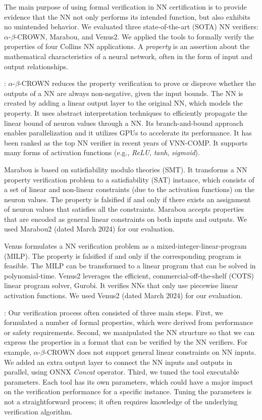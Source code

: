 The main purpose of using formal verification in NN certification is to provide evidence that the NN not only performs its intended function, but also exhibits no unintended behavior. 
We evaluated three state-of-the-art (SOTA) NN verifiers: $\alpha$-$\beta$-CROWN, Marabou, and Venus2. We applied the tools to formally verify the properties of four Collins NN applications. A \textit{property} is an assertion about the mathematical characteristics of a neural network, often in the form of input and output relationships.

: 
$\alpha$-$\beta$-CROWN \cite{abcrown} reduces the property verification to prove or disprove whether the outputs of a NN are always non-negative, given the input bounds. The NN is created by adding a linear output layer to the original NN, which models the property. It uses abstract interpretation techniques to efficiently propagate the linear bound of neuron values through a NN. Its branch-and-bound approach enables parallelization and it utilizes GPUs to accelerate its performance. It has been ranked as the top NN verifier in recent years of VNN-COMP. It supports many forms of activation functions (e.g., \textit{ReLU}, \textit{tanh}, \textit{sigmoid}).

Marabou \cite{marabou} \cite{marabou2} is based on satisfiability modulo theories (SMT). It transforms a NN property verification problem to a satisfiability (SAT) instance, which consists of a set of linear and non-linear constraints (due to the activation functions) on the neuron values. The property is falsified if and only if there exists an assignment of neuron values that satisfies all the constraints. Marabou accepts properties that are encoded as general linear constraints on both inputs and outputs. We used Marabou2 (dated March 2024) for our evaluation.

Venus \cite{venus} formulates a NN verification problem as a mixed-integer-linear-program (MILP). The property is falsified if and only if the corresponding program is feasible. The MILP can be transformed to a linear program that can be solved in polynomial-time. Venus2 leverages the efficient, commercial-off-the-shelf (COTS) linear program solver, Gurobi. It verifies NNs that only use piecewise linear activation functions. We used Venus2 (dated March 2024) for our evaluation.

: Our verification process often consisted of three main steps. First, we formulated a number of formal properties, which were derived from performance or safety requirements. Second, we manipulated the NN structure so that we can express the properties in a format that can be verified by the NN verifiers. For example, $\alpha$-$\beta$-CROWN does not support general linear constraints on NN inputs. We added an extra output layer to connect the NN inputs and outputs in parallel, using ONNX \emph{Concat} operator. Third, we tuned the tool executable parameters. Each tool has its own parameters, which could have a major impact on the verification performance for a specific instance. Tuning the parameters is not a straightforward process; it often requires knowledge of the underlying verification algorithm. 

